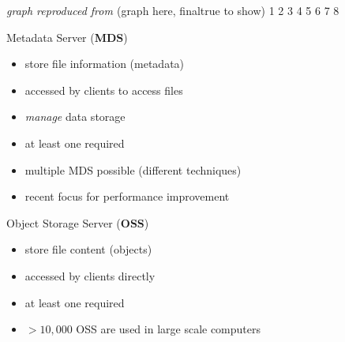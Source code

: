 \begin{frame}
{
    }

    \hfill{\scriptsize\emph{graph reproduced from \cite{whitepaper}}}
\else
    (graph here, finaltrue to show)
     {1}
     {2}
     {3}
     {4}
     {5}
     {6}
     {7}
     {8}
\fi
\end{frame}

\begin{frame}{Metadata Server (\textbf{MDS})}
    \begin{itemize}
        \item store file information (metadata)
        \item accessed by clients to access files
        \item \emph{manage} data storage
        \item at least one required
        \item multiple MDS possible (different techniques)
        \item recent focus for performance improvement
    \end{itemize}
\end{frame}


\begin{frame}{Object Storage Server (\textbf{OSS})}
    \begin{itemize}
        \item store file content (objects)
        \item accessed by clients directly
        \item at least one required
        \item $>10,000$ OSS are used in large scale computers
    \end{itemize}
\end{frame}


